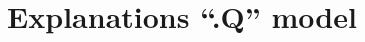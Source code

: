 \documentclass[10pt, conference, compsocconf]{IEEEtran}
\begin{document}
%
\title{Explanations ``.Q'' model} 


%


% 
\end{document}
